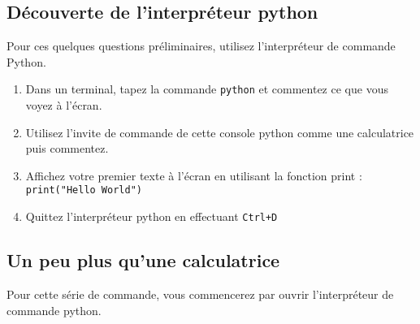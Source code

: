 
\subsection{Découverte de l'interpréteur python}

Pour ces quelques questions préliminaires, utilisez l'interpréteur de commande Python.

\begin{enumerate}

\item Dans un terminal, tapez la commande \texttt{python} et commentez ce que vous voyez à l'écran.

\item Utilisez l'invite de commande de cette console python comme une calculatrice puis commentez.

\item Affichez votre premier texte à l'écran en utilisant la fonction print : \\
   \texttt{print("Hello World")}

\item Quittez l'interpréteur python en effectuant  \texttt{Ctrl+D}

\end{enumerate}


\subsection{Un peu plus qu'une calculatrice}

Pour cette série de commande, vous commencerez par ouvrir l'interpréteur de commande python.

